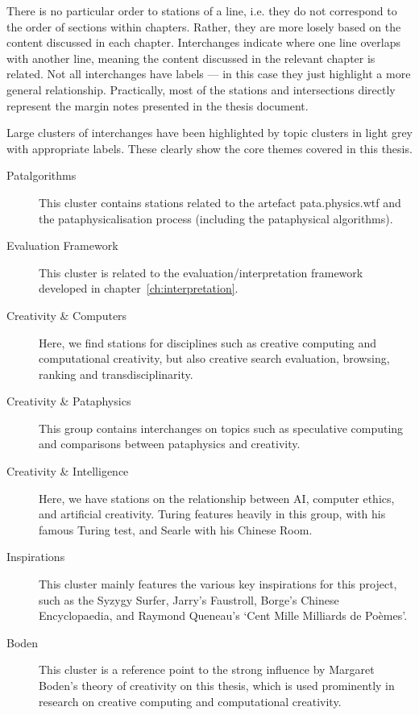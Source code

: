 \documentclass[11pt]{thesis} %
\begin{document}
There is no particular order to stations of a line, i.e. they do not correspond to the order of sections within chapters. Rather, they are more losely based on the content discussed in each chapter. Interchanges indicate where one line overlaps with another line, meaning the content discussed in the relevant chapter is related. Not all interchanges have labels --- in this case they just highlight a more general relationship. Practically, most of the stations and intersections directly represent the margin notes presented in the thesis document.

Large clusters of interchanges have been highlighted by topic clusters in light grey with appropriate labels. These clearly show the core themes covered in this thesis.

\begin{description}
  \item [Patalgorithms] This cluster contains stations related to the artefact pata.physics.wtf and the pataphysicalisation process (including the pataphysical algorithms).
  \item [Evaluation Framework] This cluster is related to the evaluation/interpretation framework developed in chapter~\ref{ch:interpretation}.
  \item [Creativity \& Computers] Here, we find stations for disciplines such as creative computing and computational creativity, but also creative search evaluation, browsing, ranking and transdisciplinarity. 
  \item [Creativity \& Pataphysics] This group contains interchanges on topics such as speculative computing and comparisons between pataphysics and creativity.
  \item [Creativity \& Intelligence] Here, we have stations on the relationship between \acs{AI}, computer ethics, and artificial creativity. Turing features heavily in this group, with his famous Turing test, and Searle with his Chinese Room.
  \item [Inspirations] This cluster mainly features the various key inspirations for this project, such as the Syzygy Surfer, Jarry's Faustroll, Borge's Chinese Encyclopaedia, and Raymond Queneau's `Cent Mille Milliards de Poèmes'.
  \item [Boden] This cluster is a reference point to the strong influence by Margaret Boden's theory of creativity on this thesis, which is used prominently in research on creative computing and computational creativity.
\end{description}
\end{document}
